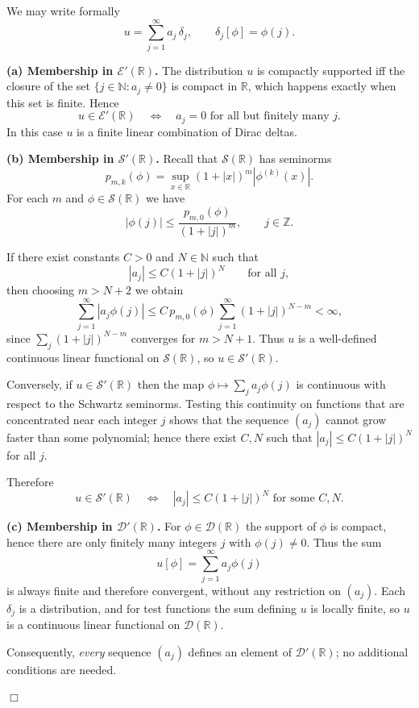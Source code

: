\begin{solution}
We may write formally
\[
u = \sum_{j=1}^\infty a_j\,\delta_j,
\qquad \delta_j[\phi]=\phi(j).
\]

\par\medskip\noindent\textbf{(a) Membership in $\mathcal{E}'(\mathbb{R})$.}\quad
The distribution $u$ is compactly supported iff the closure of the set
$\{j\in\mathbb{N}: a_j\neq 0\}$ is compact in $\mathbb{R}$, which
happens exactly when this set is finite. Hence
\[
u\in\mathcal{E}'(\mathbb{R})
\quad\Longleftrightarrow\quad
a_j=0 \text{ for all but finitely many } j.
\]
In this case $u$ is a finite linear combination of Dirac deltas.

\par\medskip\noindent\textbf{(b) Membership in $\mathcal{S}'(\mathbb{R})$.}\quad
Recall that $\mathcal{S}(\mathbb{R})$ has seminorms
\[
p_{m,k}(\phi) = \sup_{x\in\mathbb{R}} (1+|x|)^m |\phi^{(k)}(x)|.
\]
For each $m$ and $\phi\in\mathcal{S}(\mathbb{R})$ we have
\[
|\phi(j)| \le \frac{p_{m,0}(\phi)}{(1+|j|)^m},\qquad j\in\mathbb{Z}.
\]

If there exist constants $C>0$ and $N\in\mathbb{N}$ such that
\[
|a_j| \le C(1+|j|)^N \qquad\text{for all } j,
\]
then choosing $m>N+2$ we obtain
\[
\sum_{j=1}^\infty |a_j\phi(j)|
\le C\,p_{m,0}(\phi)
\sum_{j=1}^\infty (1+|j|)^{N-m}
< \infty,
\]
since $\sum_j (1+|j|)^{N-m}$ converges for $m>N+1$. Thus $u$ is a
well-defined continuous linear functional on $\mathcal{S}(\mathbb{R})$,
so $u\in\mathcal{S}'(\mathbb{R})$.

Conversely, if $u\in\mathcal{S}'(\mathbb{R})$ then the map
$\phi\mapsto \sum_j a_j\phi(j)$ is continuous with respect to the
Schwartz seminorms. Testing this continuity on functions that are
concentrated near each integer $j$ shows that the sequence $(a_j)$
cannot grow faster than some polynomial; hence there exist $C,N$ such
that $|a_j|\le C(1+|j|)^N$ for all $j$.

Therefore
\[
u\in\mathcal{S}'(\mathbb{R})
\quad\Longleftrightarrow\quad
|a_j|\le C(1+|j|)^N \text{ for some }C,N.
\]

\par\medskip\noindent\textbf{(c) Membership in $\mathcal{D}'(\mathbb{R})$.}\quad
For $\phi\in\mathcal{D}(\mathbb{R})$ the support of $\phi$ is compact,
hence there are only finitely many integers $j$ with $\phi(j)\neq0$.
Thus the sum
\[
u[\phi] = \sum_{j=1}^\infty a_j\phi(j)
\]
is always finite and therefore convergent, without any restriction on
$(a_j)$. Each $\delta_j$ is a distribution, and for test functions the
sum defining $u$ is locally finite, so $u$ is a continuous linear
functional on $\mathcal{D}(\mathbb{R})$.

Consequently, \emph{every} sequence $(a_j)$ defines an element of
$\mathcal{D}'(\mathbb{R})$; no additional conditions are needed.

\hfill$\Box$
\end{solution}

